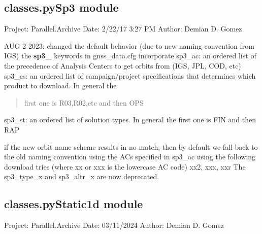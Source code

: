 \documentclass[letterpaper,10pt,english]{sphinxmanual}
\begin{document}
\subsection{classes.pySp3 module}
\label{\detokenize{classes:module-classes.pySp3}}\label{\detokenize{classes:classes-pysp3-module}}
\sphinxAtStartPar
Project: Parallel.Archive
Date: 2/22/17 3:27 PM
Author: Demian D. Gomez

\sphinxAtStartPar
AUG 2 2023: changed the default behavior (due to new naming convention from IGS)
the {\color{red}\bfseries{}sp3\_} keywords in gnss\_data.cfg incorporate
sp3\_ac: an ordered list of the precedence of Analysis Centers to get orbits from (IGS, JPL, COD, etc)
sp3\_cs: an ordered list of campaign/project specifications that determines which product to download. In general the
\begin{quote}

\sphinxAtStartPar
first one is R03,R02,etc and then OPS
\end{quote}

\sphinxAtStartPar
sp3\_st: an ordered list of solution types. In general the first one is FIN and then RAP

\sphinxAtStartPar
if the new orbit name scheme results in no match, then by default we fall back to the old naming convention using the
ACs specified in sp3\_ac using the following download tries (where xx or xxx is the lowercase AC code) xx2, xxx, xxr
The sp3\_type\_x and sp3\_altr\_x are now deprecated.


\subsection{classes.pyStatic1d module}
\label{\detokenize{classes:module-classes.pyStatic1d}}\label{\detokenize{classes:classes-pystatic1d-module}}
\sphinxAtStartPar
Project: Parallel.Archive
Date: 03/11/2024
Author: Demian D. Gomez
\end{document}
